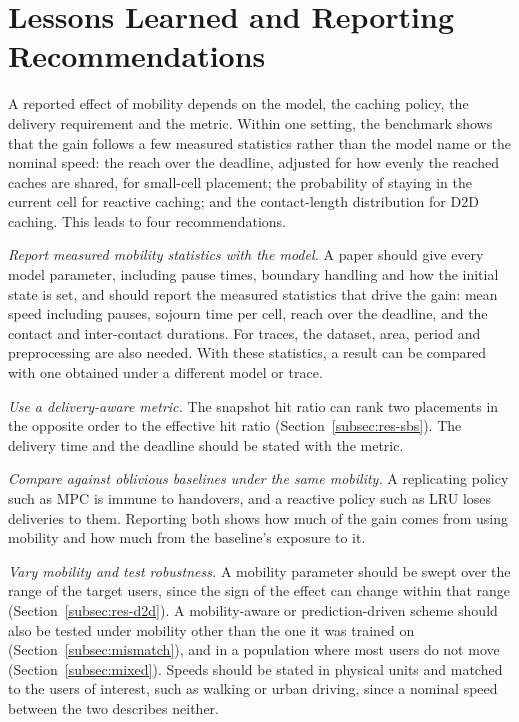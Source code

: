 
\section{Lessons Learned and Reporting Recommendations}
\label{sec:lessons}

A reported effect of mobility depends on the model, the caching policy, the delivery requirement and the metric. Within one setting, the benchmark shows that the gain follows a few measured statistics rather than the model name or the nominal speed: the reach over the deadline, adjusted for how evenly the reached caches are shared, for small-cell placement; the probability of staying in the current cell for reactive caching; and the contact-length distribution for D2D caching. This leads to four recommendations.

\emph{Report measured mobility statistics with the model.} A paper should give every model parameter, including pause times, boundary handling and how the initial state is set, and should report the measured statistics that drive the gain: mean speed including pauses, sojourn time per cell, reach over the deadline, and the contact and inter-contact durations. For traces, the dataset, area, period and preprocessing are also needed. With these statistics, a result can be compared with one obtained under a different model or trace.

\emph{Use a delivery-aware metric.} The snapshot hit ratio can rank two placements in the opposite order to the effective hit ratio (Section~\ref{subsec:res-sbs}). The delivery time and the deadline should be stated with the metric.

\emph{Compare against oblivious baselines under the same mobility.} A replicating policy such as MPC is immune to handovers, and a reactive policy such as LRU loses deliveries to them. Reporting both shows how much of the gain comes from using mobility and how much from the baseline's exposure to it.

\emph{Vary mobility and test robustness.} A mobility parameter should be swept over the range of the target users, since the sign of the effect can change within that range (Section~\ref{subsec:res-d2d}). A mobility-aware or prediction-driven scheme should also be tested under mobility other than the one it was trained on (Section~\ref{subsec:mismatch}), and in a population where most users do not move (Section~\ref{subsec:mixed}). Speeds should be stated in physical units and matched to the users of interest, such as walking or urban driving, since a nominal speed between the two describes neither.

